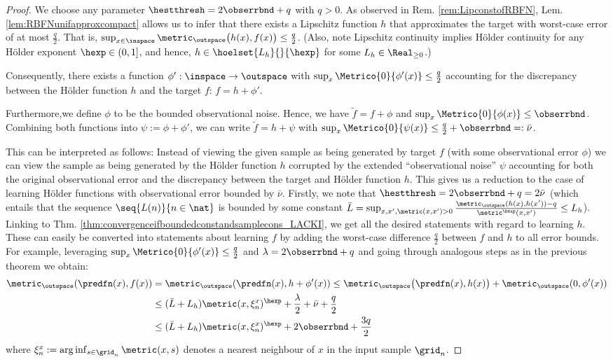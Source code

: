 \begin{proof}
We choose any parameter $\hestthresh =  2 \obserrbnd + q$ with $q >0$. As observed in Rem. \ref{rem:LipconstofRBFN}, Lem. \ref{lem:RBFNunifapproxcompact} allows us to infer that there exists a Lipschitz function $h$ that approximates the target with worst-case error of at most $\frac q 2$. That is, $\sup_{x \in \inspace} \metric_\outspace\bigl(h(x), f(x) \bigr) \leq \frac q 2$. (Also, note Lipschitz continuity implies H\"older continuity for any H\"older exponent $\hexp \in (0,1]$, and hence, $h \in \hoelset {L_h}{ }{\hexp}$ for some $ L_h \in \Real_{\geq 0}$.)

Consequently, there exists a function $\phi':\inspace \to \outspace$ with $\sup_x \Metrico{ 0}{\phi'(x) } \leq \frac q 2$ accounting for the discrepancy between the H\"older function $h$ and the target $f$: $f = h+ \phi'$. 

Furthermore,we define $\phi$ to be the bounded observational noise. Hence, we have $\tilde f = f+ \phi$ and $\sup_x \Metrico{0}{\phi(x)} \leq \obserrbnd$.
Combining both functions into $\psi := \phi+\phi'$, we can write $\tilde f = h + \psi$ with $\sup_x \Metrico{0}{\psi(x)}\leq \frac q 2 + \obserrbnd =: \bar \nu$.

This can be interpreted as follows:
Instead of viewing the given sample as being generated by target $f$ (with some observational error $\phi$) we can view the sample as being generated by the H\"older function $h$ corrupted by the extended ``observational noise'' $\psi$ accounting for both the original observational error and the discrepancy between the target and H\"older function $h$.
This gives us a reduction to the case of learning H\"older functions with observational error bounded by $\bar \nu$. Firstly, we note that $\hestthresh = 2 \obserrbnd +q =2 \bar \nu$ (which entails that the sequence $\seq{L(n)}{n \in \nat}$ is bounded by some constant $\bar L  =\sup_{x,x', \metric(x,x') >0} \frac{\metric_\outspace(h(x), h(x'))   -q}{\metric^\hexp(x,x')} \leq L_h$). 
Linking to Thm. \ref{thm:convergenceifboundedconstandsamplecons_LACKI}, we get all the desired statements with regard to learning $h$. These can easily be converted into statements about learning $f$ by adding the worst-case difference $\frac q 2$ between $f$ and $h$ to all error bounds. 
For example, leveraging $\sup_x \Metrico{ 0}{\phi'(x) } \leq \frac q 2$ and $\lambda = 2 \obserrbnd + q$ and going through analogous steps as in the previous theorem we obtain:   
\begin{align}
\metric_\outspace(\predfn(x), f(x) ) &= \metric_\outspace(\predfn(x), h+\phi' (x) ) 
\leq   \metric_\outspace\bigl(\predfn(x) , h(x)\bigr) + \metric_\outspace(0,\phi'(x) ) \\
&\leq (\bar L+ L_h) \metric(x,\xi_n^x )^\hexp + \frac \lambda 2 +\bar \nu + \frac q 2 \\
&\leq (\bar L+ L_h) \metric(x,\xi_n^x )^\hexp  +2 \obserrbnd + \frac {3q}{2} \label{ineq:euyiweeh}
\end{align}
where  $\xi^x_n := \arg\inf_{s \in \grid_n} \metric(x,s)$ denotes a nearest neighbour of $x$ in the input sample $\grid_n$.


\end{proof}
